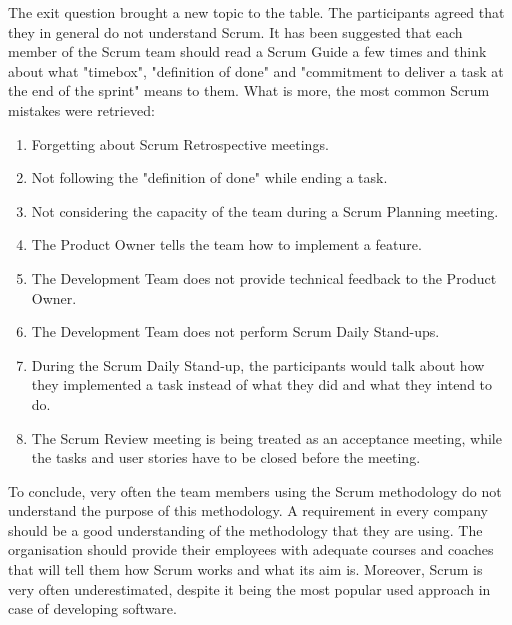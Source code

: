 The exit question brought a new topic to the table. The participants agreed that they in general do not understand Scrum. It has been suggested that each member of the Scrum team should read a Scrum Guide a few times and think about what "timebox", "definition of done" and "commitment to deliver a task at the end of the sprint" means to them. What is more, the most common Scrum mistakes were retrieved:
\begin{enumerate}
    \item Forgetting about Scrum Retrospective meetings.
    \item Not following the "definition of done" while ending a task.
    \item Not considering the capacity of the team during a Scrum Planning meeting.
    \item The Product Owner tells the team how to implement a feature.
    \item The Development Team does not provide technical feedback to the Product Owner.
    \item The Development Team does not perform Scrum Daily Stand-ups.
    \item During the Scrum Daily Stand-up, the participants would talk about how they implemented a task instead of what they did and what they intend to do.
    \item The Scrum Review meeting is being treated as an acceptance meeting, while the tasks and user stories have to be closed before the meeting.
\end{enumerate}

To conclude, very often the team members using the Scrum methodology do not understand the purpose of this methodology. A requirement in every company should be a good understanding of the methodology that they are using. The organisation should provide their employees with adequate courses and coaches that will tell them how Scrum works and what its aim is. Moreover, Scrum is very often underestimated, despite it being the most popular used approach in case of developing software.


